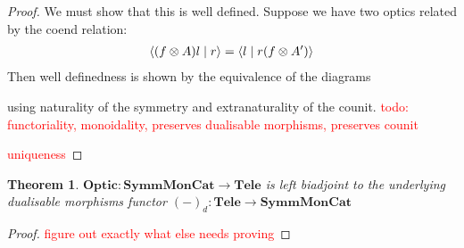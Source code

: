 \documentclass[11pt,a4paper]{article}
\theoremstyle{plain}
\newtheorem{theorem}{Theorem}[subsection]
\theoremstyle{definition}
\newcommand{\SymmMonCat}{\mathbf{SymmMonCat}}
\newcommand{\Tele}{\mathbf{Tele}}
\newcommand{\Optic}{\mathbf{Optic}}
\newcommand{\rep}[2]{{\ensuremath \left\langle #1 \mid #2 \right\rangle}}
\newcommand{\todo}[1]{\textcolor{red}{\small #1}}
\begin{document}
\begin{proof}
  We must show that this is well defined. Suppose we have two optics related by the coend relation:
  \begin{align*}
    \rep{(f \otimes A) l}{r} = \rep{l}{r (f \otimes A')}
  \end{align*}
  Then well definedness is shown by the equivalence of the diagrams
  \begin{center}
    
    \qquad \raisebox{1.5cm}{$=$} \qquad
    
  \end{center}
  using naturality of the symmetry and extranaturality of the counit.
  \todo{todo: functoriality, monoidality, preserves dualisable morphisms, preserves counit}
  
  \todo{uniqueness} 
\end{proof}

\begin{theorem}
$\Optic : \SymmMonCat \to \Tele$ is left biadjoint to the underlying dualisable morphisms functor ${(-)}_d : \Tele \to \SymmMonCat$
\end{theorem}
\begin{proof}
\todo{figure out exactly what else needs proving}
\end{proof}
\end{document}
